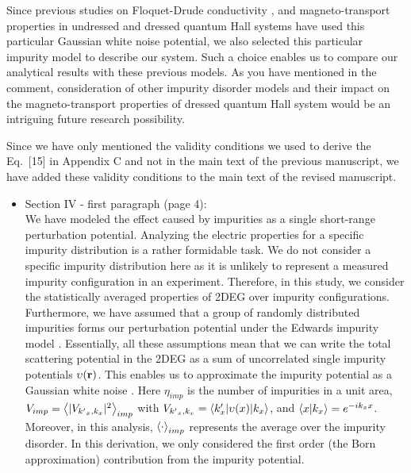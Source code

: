 \documentclass{article}
\begin{document}
Since previous studies on Floquet-Drude conductivity \cite{wackerl20}, and magneto-transport properties in undressed \cite{endo09} and dressed \cite{dini16} quantum Hall systems have used this particular Gaussian white noise potential, we also selected this particular impurity model to describe our system. Such a choice enables us to compare our analytical results with these previous models. As you have mentioned in the comment, consideration of other impurity disorder models and their impact on the
magneto-transport properties of dressed quantum Hall system would be an intriguing future research possibility.

Since we have only mentioned the validity conditions we used to derive the Eq.~[15] in Appendix C and not in the main text of the previous manuscript, we have added these validity conditions to the main text of the revised manuscript.

\begin{itemize}
  \item Section IV - first paragraph (page 4):\\
  {\color{Red}
  We have modeled the effect caused by impurities as a single short-range perturbation potential. Analyzing the electric properties for a specific impurity distribution is a rather formidable task. We do not consider a specific impurity distribution here as it is unlikely to represent a measured impurity configuration in an experiment.
  Therefore, in this study, we consider the statistically averaged properties of 2DEG over impurity configurations.
  Furthermore, we have assumed that a group of randomly distributed impurities forms our perturbation potential under the Edwards impurity model  \cite{akkermans10,wackerl20}.
  Essentially, all these assumptions mean that we can write the total scattering potential in the 2DEG as a sum of uncorrelated single impurity potentials $\upsilon(\vb{r})$. This enables us to approximate the impurity potential as a Gaussian white noise \cite{akkermans10,wackerl20}.
  Here $\eta_{imp}$ is the number of impurities in a unit area, $V_{imp} = \expval{|V_{{k'}_x,k_x}|^2}_{imp}$ with $V_{{k'}_x,k_x} = \mel**{k'_x}{\upsilon(x) }{k_x}$, and $\braket{x}{k_x} = e^{-ik_x x}$.
  Moreover, in this analysis, $\expval{\cdot}_{imp}$ represents the average over the impurity disorder. In this derivation, we only considered the first order (the Born approximation) contribution from the impurity potential.
  }
\end{itemize}
\end{document}
